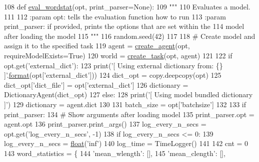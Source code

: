 \begin{DoxyCode}
108 \textcolor{keyword}{def }\hyperlink{namespaceprojects_1_1controllable__dialogue_1_1eval__wordstat_aa89fea1e83d255fa77e81e73a7d81161}{eval\_wordstat}(opt, print\_parser=None):
109     \textcolor{stringliteral}{"""}
110 \textcolor{stringliteral}{    Evaluates a model.}
111 \textcolor{stringliteral}{}
112 \textcolor{stringliteral}{    :param opt: tells the evaluation function how to run}
113 \textcolor{stringliteral}{    :param print\_parser: if provided, prints the options that are set within the}
114 \textcolor{stringliteral}{        model after loading the model}
115 \textcolor{stringliteral}{    """}
116     random.seed(42)
117 
118     \textcolor{comment}{# Create model and assign it to the specified task}
119     agent = \hyperlink{namespaceparlai_1_1core_1_1agents_a00d77a7e26fb89e8bd900f7b2a02982a}{create\_agent}(opt, requireModelExists=\textcolor{keyword}{True})
120     world = \hyperlink{namespaceparlai_1_1core_1_1worlds_a79969c7ba76d4b3c500f5bb776444dc6}{create\_task}(opt, agent)
121 
122     \textcolor{keywordflow}{if} opt.get(\textcolor{stringliteral}{'external\_dict'}):
123         print(\textcolor{stringliteral}{'[ Using external dictionary from: \{\} ]'}.\hyperlink{namespaceparlai_1_1chat__service_1_1services_1_1messenger_1_1shared__utils_a32e2e2022b824fbaf80c747160b52a76}{format}(opt[\textcolor{stringliteral}{'external\_dict'}]))
124         dict\_opt = copy.deepcopy(opt)
125         dict\_opt[\textcolor{stringliteral}{'dict\_file'}] = opt[\textcolor{stringliteral}{'external\_dict'}]
126         dictionary = DictionaryAgent(dict\_opt)
127     \textcolor{keywordflow}{else}:
128         print(\textcolor{stringliteral}{'[ Using model bundled dictionary ]'})
129         dictionary = agent.dict
130 
131     batch\_size = opt[\textcolor{stringliteral}{'batchsize'}]
132 
133     \textcolor{keywordflow}{if} print\_parser:
134         \textcolor{comment}{# Show arguments after loading model}
135         print\_parser.opt = agent.opt
136         print\_parser.print\_args()
137     log\_every\_n\_secs = opt.get(\textcolor{stringliteral}{'log\_every\_n\_secs'}, -1)
138     \textcolor{keywordflow}{if} log\_every\_n\_secs <= 0:
139         log\_every\_n\_secs = \hyperlink{namespaceprojects_1_1controllable__dialogue_1_1make__control__dataset_aa2b7207688c641dbc094ab44eca27113}{float}(\textcolor{stringliteral}{'inf'})
140     log\_time = TimeLogger()
141 
142     cnt = 0
143     word\_statistics = \{
144         \textcolor{stringliteral}{'mean\_wlength'}: [],
145         \textcolor{stringliteral}{'mean\_clength'}: [],

\end{DoxyCode}
